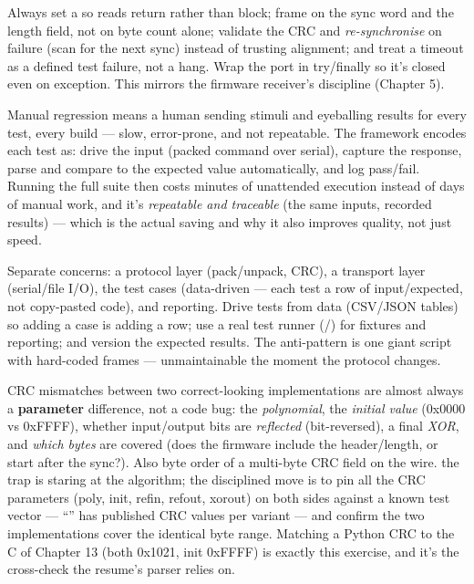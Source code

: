Always set a  so reads return rather than block; frame on the sync
word and the length field, not on byte count alone; validate the CRC and
\emph{re-synchronise} on failure (scan for the next sync) instead of trusting
alignment; and treat a timeout as a defined test failure, not a hang. Wrap the
port in try/finally so it's closed even on exception. This mirrors the firmware
receiver's discipline (Chapter 5).

Manual regression means a human sending stimuli and eyeballing results for every
test, every build --- slow, error-prone, and not repeatable. The framework
encodes each test as: drive the input (packed command over serial), capture the
response, parse and compare to the expected value automatically, and log
pass/fail. Running the full suite then costs minutes of unattended execution
instead of days of manual work, and it's \emph{repeatable and traceable} (the
same inputs, recorded results) --- which is the actual saving and why it also
improves quality, not just speed.

Separate concerns: a protocol layer (pack/unpack, CRC), a transport layer
(serial/file I/O), the test cases (data-driven --- each test a row of
input/expected, not copy-pasted code), and reporting. Drive tests from data
(CSV/JSON tables) so adding a case is adding a row; use a real test runner
(/) for fixtures and reporting; and version the
expected results. The anti-pattern is one giant script with hard-coded frames ---
unmaintainable the moment the protocol changes.


CRC mismatches between two correct-looking implementations are almost always a
\textbf{parameter} difference, not a code bug: the \emph{polynomial}, the
\emph{initial value} (0x0000 vs 0xFFFF), whether input/output bits are
\emph{reflected} (bit-reversed), a final \emph{XOR}, and \emph{which bytes} are
covered (does the firmware include the header/length, or start after the sync?).
Also byte order of a multi-byte CRC field on the wire. \trap the trap is staring
at the algorithm; the disciplined move is to pin all the CRC parameters (poly,
init, refin, refout, xorout) on both sides against a known test vector ---
``'' has published CRC values per variant --- and confirm the two
implementations cover the identical byte range. Matching a Python CRC to the C
 of Chapter 13 (both 0x1021, init 0xFFFF) is exactly this exercise,
and it's the cross-check the resume's parser relies on.

